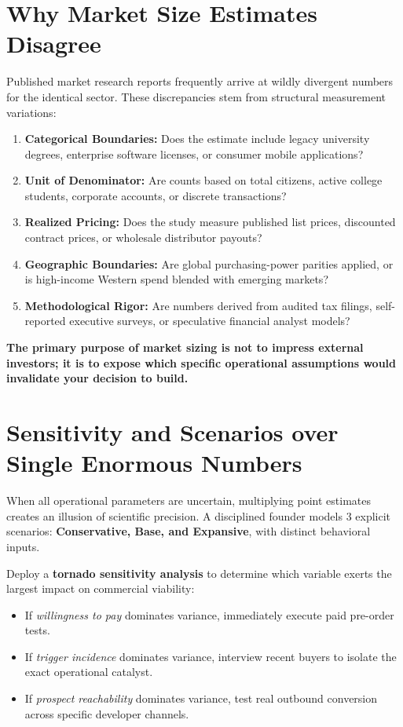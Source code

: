 \section{Why Market Size Estimates Disagree}

Published market research reports frequently arrive at wildly divergent numbers for the identical sector. These discrepancies stem from structural measurement variations:
\begin{enumerate}[leftmargin=12pt,itemsep=2pt,topsep=1pt,parsep=0pt]
  \item \textbf{Categorical Boundaries:} Does the estimate include legacy university degrees, enterprise software licenses, or consumer mobile applications?
  \item \textbf{Unit of Denominator:} Are counts based on total citizens, active college students, corporate accounts, or discrete transactions?
  \item \textbf{Realized Pricing:} Does the study measure published list prices, discounted contract prices, or wholesale distributor payouts?
  \item \textbf{Geographic Boundaries:} Are global purchasing-power parities applied, or is high-income Western spend blended with emerging markets?
  \item \textbf{Methodological Rigor:} Are numbers derived from audited tax filings, self-reported executive surveys, or speculative financial analyst models?
\end{enumerate}

\textbf{The primary purpose of market sizing is not to impress external investors; it is to expose which specific operational assumptions would invalidate your decision to build.}

\section{Sensitivity and Scenarios over Single Enormous Numbers}

When all operational parameters are uncertain, multiplying point estimates creates an illusion of scientific precision. A disciplined founder models 3 explicit scenarios: \textbf{Conservative, Base, and Expansive}, with distinct behavioral inputs.

Deploy a \textbf{tornado sensitivity analysis} to determine which variable exerts the largest impact on commercial viability:
\begin{itemize}[leftmargin=12pt,itemsep=1pt,topsep=1pt]
  \item If \textit{willingness to pay} dominates variance, immediately execute paid pre-order tests.
  \item If \textit{trigger incidence} dominates variance, interview recent buyers to isolate the exact operational catalyst.
  \item If \textit{prospect reachability} dominates variance, test real outbound conversion across specific developer channels.
\end{itemize}


